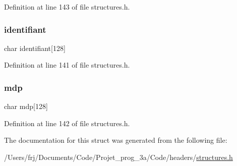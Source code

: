 Definition at line 143 of file structures.\+h.

\hypertarget{structutilisateur_aa9f89c9a3512c982fed4d4789019bdb3}{}\label{structutilisateur_aa9f89c9a3512c982fed4d4789019bdb3} 
\subsubsection{\texorpdfstring{identifiant}{identifiant}}
{\footnotesize\ttfamily char identifiant\mbox{[}128\mbox{]}}



Definition at line 141 of file structures.\+h.

\hypertarget{structutilisateur_a8af71e7f7d7c4089896f8f6498d53a22}{}\label{structutilisateur_a8af71e7f7d7c4089896f8f6498d53a22} 
\subsubsection{\texorpdfstring{mdp}{mdp}}
{\footnotesize\ttfamily char mdp\mbox{[}128\mbox{]}}



Definition at line 142 of file structures.\+h.



The documentation for this struct was generated from the following file\+:\begin{DoxyCompactItemize}
\item 
/\+Users/frj/\+Documents/\+Code/\+Projet\+\_\+prog\+\_\+3a/\+Code/headers/\hyperlink{structures_8h}{structures.\+h}\end{DoxyCompactItemize}
